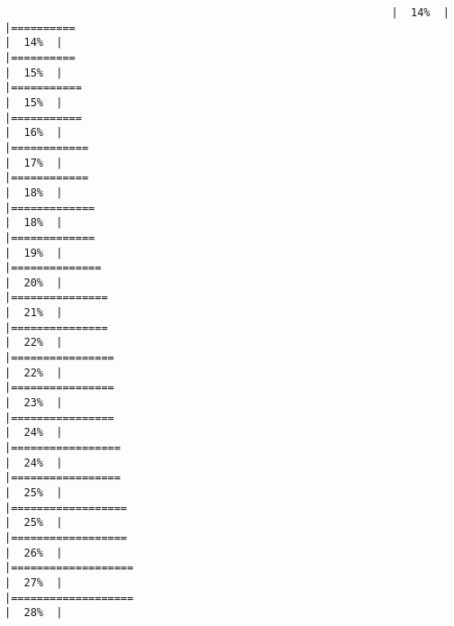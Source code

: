 \documentclass[
]{book}
\begin{document}
\begin{verbatim}
                                                            |  14%  |                                                                              |==========                                                            |  14%  |                                                                              |==========                                                            |  15%  |                                                                              |===========                                                           |  15%  |                                                                              |===========                                                           |  16%  |                                                                              |============                                                          |  17%  |                                                                              |============                                                          |  18%  |                                                                              |=============                                                         |  18%  |                                                                              |=============                                                         |  19%  |                                                                              |==============                                                        |  20%  |                                                                              |===============                                                       |  21%  |                                                                              |===============                                                       |  22%  |                                                                              |================                                                      |  22%  |                                                                              |================                                                      |  23%  |                                                                              |================                                                      |  24%  |                                                                              |=================                                                     |  24%  |                                                                              |=================                                                     |  25%  |                                                                              |==================                                                    |  25%  |                                                                              |==================                                                    |  26%  |                                                                              |===================                                                   |  27%  |                                                                              |===================                                                   |  28%  |                                                                              
\end{verbatim}
\end{document}
